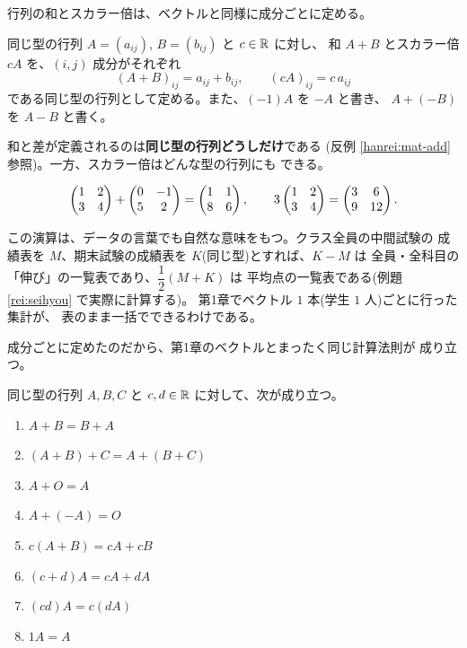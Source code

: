 行列の和とスカラー倍は、ベクトルと同様に成分ごとに定める。

\begin{teigi}[和とスカラー倍]
同じ型の行列 $A = (a_{ij})$, $B = (b_{ij})$ と $c \in \mathbb{R}$ に対し、
和 $A + B$ とスカラー倍 $cA$ を、$(i,j)$ 成分がそれぞれ
\[
(A + B)_{ij} = a_{ij} + b_{ij}, \qquad (cA)_{ij} = c\,a_{ij}
\]
である同じ型の行列として定める。また、$(-1)A$ を $-A$ と書き、
$A + (-B)$ を $A - B$ と書く。
\end{teigi}

\begin{chui}
和と差が定義されるのは\textbf{同じ型の行列どうしだけ}である
(反例 \ref{hanrei:mat-add} 参照)。一方、スカラー倍はどんな型の行列にも
できる。
\end{chui}

\begin{rei}
\[
\begin{pmatrix}1 & 2 \\ 3 & 4\end{pmatrix} + \begin{pmatrix}0 & -1 \\ 5 & 2\end{pmatrix} = \begin{pmatrix}1 & 1 \\ 8 & 6\end{pmatrix},
\qquad
3 \begin{pmatrix}1 & 2 \\ 3 & 4\end{pmatrix} = \begin{pmatrix}3 & 6 \\ 9 & 12\end{pmatrix}.
\]
\end{rei}

この演算は、データの言葉でも自然な意味をもつ。クラス全員の中間試験の
成績表を $M$、期末試験の成績表を $K$(同じ型)とすれば、$K - M$ は
全員・全科目の「伸び」の一覧表であり、$\dfrac{1}{2}(M + K)$ は
平均点の一覧表である(例題 \ref{rei:seihyou} で実際に計算する)。
第1章でベクトル $1$ 本(学生 $1$ 人)ごとに行った集計が、
表のまま一括でできるわけである。

成分ごとに定めたのだから、第1章のベクトルとまったく同じ計算法則が
成り立つ。

\begin{teiri}[和とスカラー倍の計算法則]\label{thm:matops}
同じ型の行列 $A, B, C$ と $c, d \in \mathbb{R}$ に対して、次が成り立つ。
\begin{enumerate}
\item $A + B = B + A$
\item $(A + B) + C = A + (B + C)$
\item $A + O = A$
\item $A + (-A) = O$
\item $c(A + B) = cA + cB$
\item $(c + d)A = cA + dA$
\item $(cd)A = c(dA)$
\item $1A = A$
\end{enumerate}
\end{teiri}

